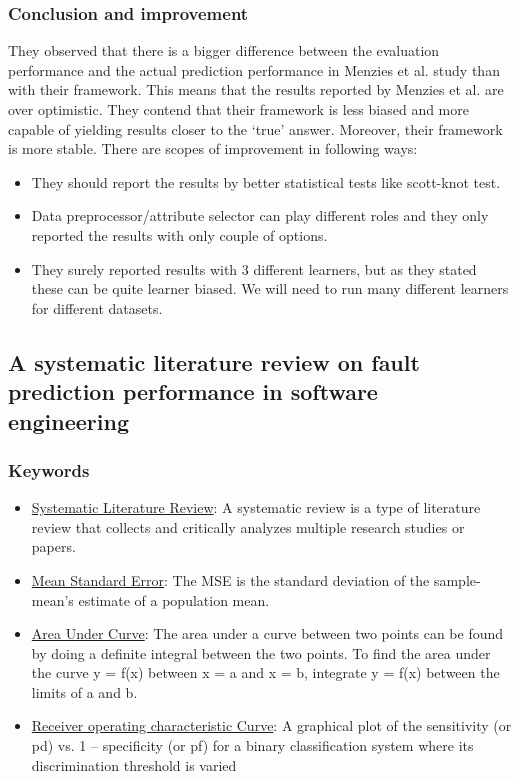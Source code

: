 \documentclass[conference]{IEEEtran}
\begin{document}
\subsubsection{\textbf{Conclusion and improvement}}
 They observed that there is a bigger difference between the evaluation performance
and the actual prediction performance in Menzies et al. study than with their framework. This means that the results reported by Menzies et al. are over optimistic. They contend that their framework is less biased and more capable of yielding results closer to the ‘true’ answer. Moreover, their framework is more
stable. There are scopes of improvement in following ways:
\begin{itemize}
    \item They should report the results by better statistical tests like scott-knot test. 
    \item Data preprocessor/attribute selector can play different roles and they only reported the results with only couple of options.
    \item They surely reported results with 3 different learners, but as they stated these can be quite learner biased. We will need to run many different learners for different datasets.
\end{itemize}

\subsection{\textbf{A systematic literature review on fault prediction performance in software engineering~\cite{hall2012systematic}}}
\subsubsection{\textbf{Keywords}}
\begin{itemize}
    \item \underline{Systematic Literature Review}: A systematic review is a type of literature review that collects and critically analyzes multiple research studies or papers.
    \item \underline{Mean Standard Error}: The MSE is the standard deviation of the sample-mean's estimate of a population mean.
    \item \underline{Area Under Curve}: The area under a curve between two points can be found by doing a definite integral between the two points. To find the area under the curve y = f(x) between x = a and x = b, integrate y = f(x) between the limits of a and b.
    \item \underline{Receiver operating characteristic Curve}: A graphical plot of the sensitivity (or pd) vs. 1 – specificity (or pf) for a binary classification system where its discrimination threshold is varied
\end{itemize}
\end{document}
